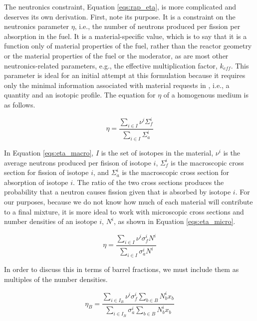 The neutronics constraint, Equation \ref{eqs:rap_eta}, is more complicated and
deserves its own derivation. First, note its purpose. It is a constraint on the
neutronics parameter $\eta$, i.e., the number of neutrons produced per fission
per absorption in the fuel. It is a material-specific value, which is to say
that it is a function only of material properties of the fuel, rather than the
reactor geometry or the material properties of the fuel or the moderator, as are
most other neutronics-related parameters, e.g., the effective multiplication
factor, $k_{eff}$. This parameter is ideal for an initial attempt at this
formulation because it requires only the minimal information associated with
material requests in \Cyclus, i.e., a quantity and an isotopic profile. The
equation for $\eta$ of a homogenous medium is as follows.

\begin{equation}
\label{eqs:eta_macro}
\eta = \frac{\sum_{i \in I} \nu^{i} \Sigma_{f}^{i}}
            {\sum_{i \in I} \Sigma_{a}^{i}}
\end{equation}

In Equation \ref{eqs:eta_macro}, $I$ is the set of isotopes in the material,
$\nu^{i}$ is the average neutrons produced per fisison of isotope $i$,
$\Sigma_{f}^{i}$ is the macroscopic cross section for fission of isotope $i$,
and $\Sigma_{a}^{i}$ is the macroscopic cross section for absorption of isotope
$i$. The ratio of the two cross sections produces the probability that a neutron
causes fission given that is absorbed by isotope $i$. For our purposes, because
we do not know how much of each material will contribute to a final mixture, it
is more ideal to work with microscopic cross sections and number densities of an
isotope $i$, $N^{i}$, as shown in Equation \ref{eqs:eta_micro}.

\begin{equation}
\label{eqs:eta_micro}
\eta = \frac{\sum_{i \in I} \nu^{i} \sigma_{f}^{i} N^{i}}
            {\sum_{i \in I} \sigma_{a}^{i} N^{i}}
\end{equation}

In order to discuss this in terms of barrel fractions, we must include them as
multiples of the number densities. 

\begin{equation}
\label{eqs:eta_fractions_nonlin}
\eta_{B} = \frac{\sum_{i \in I_{B}} \nu^{i} \sigma_{f}^{i} \sum_{b \in B} N_{b}^{i} x_{b}}
                {\sum_{i \in I_{B}} \sigma_{a}^{i} \sum_{b \in B} N_{b}^{i} x_{b}}
\end{equation}

